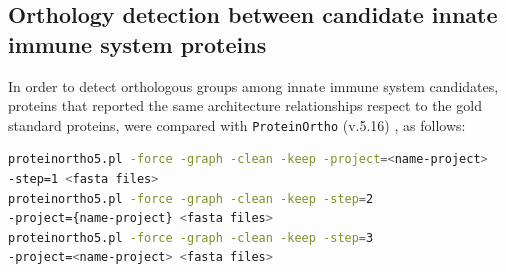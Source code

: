 \documentclass[11pt]{article}
\begin{document}


\subsection*{Orthology detection between candidate innate immune system 
proteins}
In order to detect orthologous groups among innate immune system candidates, 
proteins that reported the same architecture relationships respect to the gold 
standard proteins, were compared with \texttt{ProteinOrtho} 
(v.5.16) \cite{Lechner2011}, as follows:


\begin{lstlisting}[language=bash, breaklines=true]
proteinortho5.pl -force -graph -clean -keep -project=<name-project> 
-step=1 <fasta files>
proteinortho5.pl -force -graph -clean -keep -step=2 
-project={name-project} <fasta files>
proteinortho5.pl -force -graph -clean -keep -step=3  
-project=<name-project> <fasta files>
\end{lstlisting}
\end{document}
